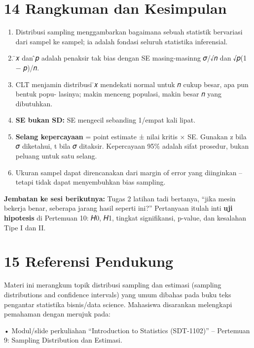 \documentclass[
  indonesian,
  letterpaper,
]{book}
\begin{document}

\chapter{14 Rangkuman dan Kesimpulan}\label{rangkuman-dan-kesimpulan}

\begin{enumerate}
\def\labelenumi{\arabic{enumi}.}
\item
  Distribusi sampling menggambarkan bagaimana sebuah statistik
  bervariasi dari sampel ke sampel; ia adalah fondasi seluruh statistika
  inferensial.
\item
  ̄𝑥 dan ̂𝑝 adalah penaksir tak bias dengan SE masing-masinng 𝜎/√𝑛 dan
  √𝑝(1 − 𝑝)/𝑛.
\item
  CLT menjamin distribusi ̄𝑥 mendekati normal untuk 𝑛 cukup besar, apa
  pun bentuk popu- lasinya; makin menceng populasi, makin besar 𝑛 yang
  dibutuhkan.
\item
  \textbf{SE bukan SD:} SE mengecil sebanding 1/empat kali lipat.
\item
  \textbf{Selang kepercayaan} = point estimate ± nilai kritis × SE.
  Gunakan z bila 𝜎 diketahui, t bila 𝜎 ditaksir. Kepercayaan 95\% adalah
  sifat prosedur, bukan peluang untuk satu selang.
\item
  Ukuran sampel dapat direncanakan dari margin of error yang diinginkan
  -- tetapi tidak dapat menyembuhkan bias sampling.
\end{enumerate}

\textbf{Jembatan ke sesi berikutnya:} Tugas 2 latihan tadi bertanya,
``jika mesin bekerja benar, seberapa jarang hasil seperti ini?''
Pertanyaan itulah inti \textbf{uji hipotesis} di Pertemuan 10: 𝐻0, 𝐻1,
tingkat signifikansi, p-value, dan kesalahan Tipe I dan II.


\chapter{15 Referensi Pendukung}\label{referensi-pendukung}

Materi ini merangkum topik distribusi sampling dan estimasi (sampling
distributions and confidence intervals) yang umum dibahas pada buku teks
pengantar statistika bisnis/data science. Mahasiswa disarankan
melengkapi pemahaman dengan merujuk pada:

• Modul/slide perkuliahan ``Introduction to Statistics (SDT-1102)'' --
Pertemuan 9: Sampling Distribution dan Estimasi.
\end{document}
